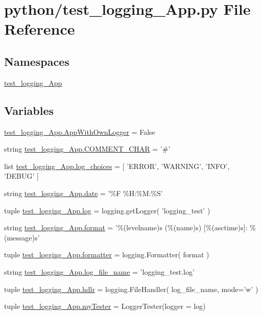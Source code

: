 \section{python/test\-\_\-logging\-\_\-\-App.py File Reference}
\label{test__logging__App_8py}
\subsection*{Namespaces}
\begin{DoxyCompactItemize}
\item 
\hyperlink{namespacetest__logging__App}{test\-\_\-logging\-\_\-\-App}
\end{DoxyCompactItemize}
\subsection*{Variables}
\begin{DoxyCompactItemize}
\item 
\hyperlink{namespacetest__logging__App_ac4657730e1d4f00da86f8ae0a58755ee}{test\-\_\-logging\-\_\-\-App.\-App\-With\-Own\-Logger} = False
\item 
string \hyperlink{namespacetest__logging__App_a7990af3868da1b720d19dae08fb151ee}{test\-\_\-logging\-\_\-\-App.\-C\-O\-M\-M\-E\-N\-T\-\_\-\-C\-H\-A\-R} = '\#'
\item 
list \hyperlink{namespacetest__logging__App_af6aae0be66083e03432f922a877d6e76}{test\-\_\-logging\-\_\-\-App.\-log\-\_\-choices} = \mbox{[} 'E\-R\-R\-O\-R', 'W\-A\-R\-N\-I\-N\-G', 'I\-N\-F\-O', 'D\-E\-B\-U\-G' \mbox{]}
\item 
string \hyperlink{namespacetest__logging__App_ac9e5fdf9ce0d042f17cfcfa62f4f1d9e}{test\-\_\-logging\-\_\-\-App.\-date} = '\%F \%H\-:\%M\-:\%S'
\item 
tuple \hyperlink{namespacetest__logging__App_a5661d99b9ac2ebd5efc47fa7c851410e}{test\-\_\-logging\-\_\-\-App.\-log} = logging.\-get\-Logger( 'logging\-\_\-test' )
\item 
string \hyperlink{namespacetest__logging__App_a98e4a4b1eaf638f7b38229336efaac0a}{test\-\_\-logging\-\_\-\-App.\-format} = '\%(levelname)s (\%(name)s) \mbox{[}\%(asctime)s\mbox{]}\-: \%(message)s'
\item 
tuple \hyperlink{namespacetest__logging__App_aab261ad66d0b9deb3ded5b012f19b218}{test\-\_\-logging\-\_\-\-App.\-formatter} = logging.\-Formatter( format )
\item 
string \hyperlink{namespacetest__logging__App_aed9c64e956bc04064d38fc2d1bf77201}{test\-\_\-logging\-\_\-\-App.\-log\-\_\-file\-\_\-name} = 'logging\-\_\-test.\-log'
\item 
tuple \hyperlink{namespacetest__logging__App_ab4a8f9d05288bd9c810bc3b3863167ae}{test\-\_\-logging\-\_\-\-App.\-hdlr} = logging.\-File\-Handler( log\-\_\-file\-\_\-name, mode='w' )
\item 
tuple \hyperlink{namespacetest__logging__App_afaeeba25074786a02ffb0098ab24315d}{test\-\_\-logging\-\_\-\-App.\-my\-Tester} = Logger\-Tester(logger = log)
\end{DoxyCompactItemize}
